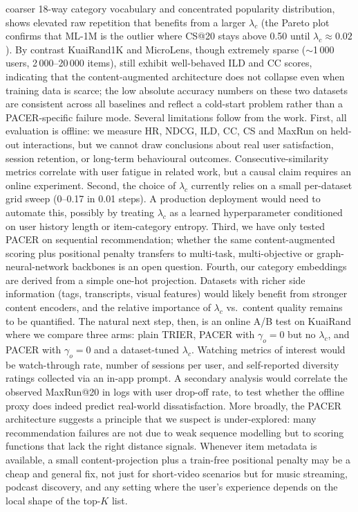 \begin{conclusion}
coarser 18-way category vocabulary and concentrated popularity
distribution, shows elevated raw repetition that benefits from a larger
$\lambda_c$ (the Pareto plot confirms that ML-1M is the outlier where
CS@20 stays above 0.50 until $\lambda_c \approx 0.02$). By contrast
KuaiRand1K and MicroLens, though extremely sparse ($\sim$1\,000 users,
2\,000--20\,000 items), still exhibit well-behaved ILD and CC scores,
indicating that the content-augmented architecture does not collapse
even when training data is scarce; the low absolute accuracy numbers on
these two datasets are consistent across all baselines and reflect a
cold-start problem rather than a PACER-specific failure mode.
Several limitations follow from the work. First, all evaluation is
offline: we measure HR, NDCG, ILD, CC, CS and MaxRun on held-out
interactions, but we cannot draw conclusions about real user
satisfaction, session retention, or long-term behavioural outcomes.
Consecutive-similarity metrics correlate with user fatigue in related
work, but a causal claim requires an online experiment. Second, the
choice of $\lambda_c$ currently relies on a small per-dataset grid sweep
(0--0.17 in 0.01 steps). A production deployment would need to automate
this, possibly by treating $\lambda_c$ as a learned hyperparameter
conditioned on user history length or item-category entropy. Third, we
have only tested PACER on sequential recommendation; whether the same
content-augmented scoring plus positional penalty transfers to
multi-task, multi-objective or graph-neural-network backbones is an open
question. Fourth, our category embeddings are derived from a simple
one-hot projection. Datasets with richer side information (tags,
transcripts, visual features) would likely benefit from stronger content
encoders, and the relative importance of $\lambda_c$ vs.\ content
quality remains to be quantified.
The natural next step, then, is an online A/B test on KuaiRand
where we compare three arms: plain TRIER, PACER with $\gamma_o=0$
but no $\lambda_c$, and PACER with $\gamma_o=0$ and a dataset-tuned
$\lambda_c$. Watching metrics of interest would be watch-through rate,
number of sessions per user, and self-reported diversity ratings collected
via an in-app prompt. A secondary analysis would correlate the observed
MaxRun@20 in logs with user drop-off rate, to test whether the offline
proxy does indeed predict real-world dissatisfaction. More broadly, the
PACER architecture suggests a principle that we suspect is under-explored:
many recommendation failures are not due to weak sequence modelling but
to scoring functions that lack the right distance signals. Whenever item
metadata is available, a small content-projection plus a train-free
positional penalty may be a cheap and general fix, not just for short-video
scenarios but for music streaming, podcast discovery, and any setting
where the user's experience depends on the local shape of the top-$K$ list.
\end{conclusion}
